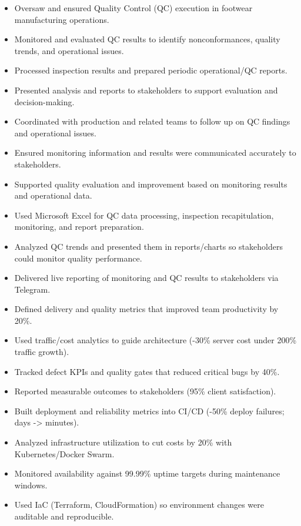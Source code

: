 
\begin{itemize}
\item Oversaw and ensured Quality Control (QC) execution in footwear manufacturing operations.
\item Monitored and evaluated QC results to identify nonconformances, quality trends, and operational issues.
\item Processed inspection results and prepared periodic operational/QC reports.
\item Presented analysis and reports to stakeholders to support evaluation and decision-making.
\item Coordinated with production and related teams to follow up on QC findings and operational issues.
\item Ensured monitoring information and results were communicated accurately to stakeholders.
\item Supported quality evaluation and improvement based on monitoring results and operational data.
\item Used Microsoft Excel for QC data processing, inspection recapitulation, monitoring, and report preparation.
\item Analyzed QC trends and presented them in reports/charts so stakeholders could monitor quality performance.
\item Delivered live reporting of monitoring and QC results to stakeholders via Telegram.
\end{itemize}
\divider

\begin{itemize}
\item Defined delivery and quality metrics that improved team productivity by 20\%.
\item Used traffic/cost analytics to guide architecture (-30\% server cost under 200\% traffic growth).
\item Tracked defect KPIs and quality gates that reduced critical bugs by 40\%.
\item Reported measurable outcomes to stakeholders (95\% client satisfaction).
\end{itemize}
\divider

\begin{itemize}
\item Built deployment and reliability metrics into CI/CD (-50\% deploy failures; days -> minutes).
\item Analyzed infrastructure utilization to cut costs by 20\% with Kubernetes/Docker Swarm.
\item Monitored availability against 99.99\% uptime targets during maintenance windows.
\item Used IaC (Terraform, CloudFormation) so environment changes were auditable and reproducible.
\end{itemize}
\divider

